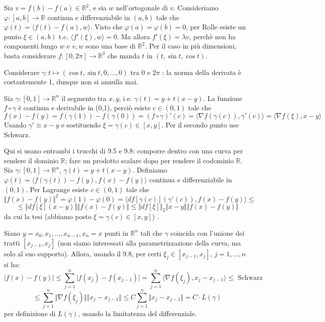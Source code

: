  Sia $v = f(b) - f(a) \in \mathbb{R}^2$, e sia $w$  nell'ortogonale di $v$. Consideriamo $\varphi: [a,b] \rightarrow \mathbb{R} $ continua e differenziabile in $(a,b)$ tale che $\varphi(t) = \langle f(t) - f(a), w \rangle$. Visto che $\varphi(a) = \varphi(b) = 0$, per Rolle esiste un punto $\xi \in (a,b) $ t.c. $  \langle f'(\xi), w \rangle = 0$. Ma allora $f'(\xi) = \lambda v$, perchè non ha componenti lungo $w$ e $v,w$ sono una base di $\mathbb{R}^2$. \newline
Per il caso in più dimensioni, basta considerare $f: [0,2 \pi] \rightarrow \mathbb{R}^3$ che manda $t$ in $(t,\sin t, \cos t) $.

 Considerare $ \gamma: t \mapsto (\cos t, \sin t, 0, \ldots, 0)$  tra 0 e $2 \pi$ : la norma della derivata è costantemente 1, dunque non si annulla mai.

 Sia $\gamma: [0,1] \to \mathbb{R}^n$ il segmento tra $x,y$, i.e. $\gamma(t) = y + t(x-y)$. La funzione $f \circ \gamma$ è continua e derivabile in (0,1), perciò esiste $c \in (0,1)$ tale che
$$ f(x) - f(y) = f(\gamma(1) ) - f(\gamma(0) ) = (f \circ \gamma)' (c) = \langle \nabla f ( \gamma(c) ) , \gamma'(c) \rangle  = \langle \nabla f ( \xi ) , x-y \rangle $$
Usando $\gamma' \equiv x-y$ e sostituendo $\xi = \gamma(c) \in [x,y]$. Per il secondo punto use Schwarz.

 Qui si usano entrambi i trucchi di 9.5 e 9.8: comporre dentro con una curva per rendere il dominio $\mathbb{R}$; fare un prodotto scalare dopo per rendere il codominio $\mathbb{R}$. Sia $\gamma: [0,1] \rightarrow \mathbb{R}^n$, $\gamma(t) = y +t(x-y)$. Definiamo $\varphi(t) = \langle f(\gamma (t) ) - f(y) , f(x) - f(y) \rangle $ continua e differenziabile in $(0,1)$. Per Lagrange esiste $ c \in (0,1)$ tale che 
$$ \Vert f(x) - f(y) \Vert^2 = \varphi(1) - \varphi(0) = \langle df [\gamma(c)](\gamma'(c)  ), f(x) - f(y) \rangle \le $$ 
$$ \le \Vert df[\xi](x-y) \Vert \Vert f(x) - f(y) \Vert \le \Vert df[\xi] \Vert_2 \Vert x-y \Vert \Vert f(x) - f(y) \Vert $$ 
da cui la tesi (abbiamo posto $\xi =\gamma(c) \in [x,y]$) .  

 Siano $y = x_0 , x_1, \ldots, x_{n-1}, x_n = x$ punti in $\mathbb{R}^n$ tali che $\gamma$ coincida con l'unione dei tratti $ [x_{j-1}, x_j ]$ (non siamo interessati alla parametrizzazione della curva, ma solo al suo supporto). Allora, usando il 9.8, per certi $\xi_j \in [x_{j-1}, x_j]$, $j=1, \ldots, n$ si ha:
$$ \vert f(x) - f(y) \vert \le \sum_{j=1}^n \vert f(x_j) - f(x_{j-1}) \vert  = \sum_{j=1}^n \langle \nabla f(\xi_j), x_j -x_{j-1} \rangle \le \mbox{ Schwarz} $$
$$ \le \sum_{j=1}^n \Vert \nabla f(\xi_j) \Vert \Vert x_j - x_{j-1} \Vert \le C \sum_{j=1}^n \Vert x_j - x_{j-1} \Vert = C \cdot L(\gamma) $$
per definizione di $L(\gamma)$, usando la limitatezza del differenziale.


